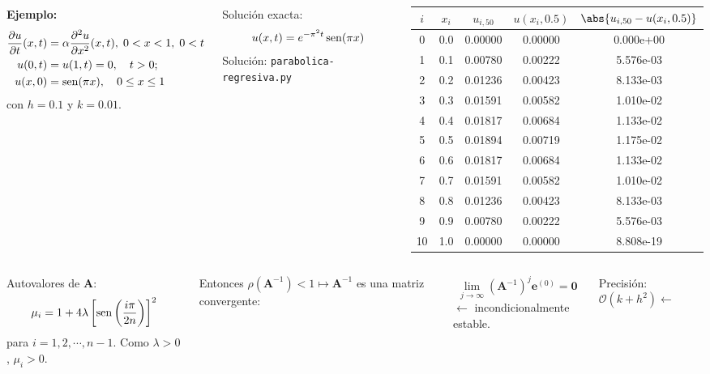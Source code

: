 \documentclass[9pt, aspectratio=169]{beamer}
\begin{document}
\begin{frame}
\begin{columns}
\textbf{Ejemplo:} 
\begin{align*}
\frac{\partial u}{\partial t} (x, t) &= \alpha \frac{\partial^2 u}{\partial x^2}(x, t), \; 0 < x < 1, \; 0 < t \\
u(0, t) &= u(1, t) = 0, \quad t > 0; \\
u(x, 0) &= \operatorname{sen}(\pi x), \quad 0 \leq x \leq 1
\end{align*}
con $h = 0.1$ y \alert{$k = 0.01$}.

Solución exacta:
\[u(x, t) = e^{-\pi^2 t} \operatorname{sen} (\pi x) \]
\centering Solución: \texttt{parabolica-regresiva.py}

\begin{center}
\begin{tabular}{ccccc}
\toprule
$i$ & $x_i$ & $u_{i,50}$ & $u(x_i, 0.5)$ & $\abs{u_{i, 50} - u(x_i, 0.5)}$ \\
\midrule
0 & 0.0 & 0.00000 & 0.00000 & 0.000e+00 \\
1 & 0.1 & 0.00780 & 0.00222 & 5.576e-03 \\
2 & 0.2 & 0.01236 & 0.00423 & 8.133e-03 \\
3 & 0.3 & 0.01591 & 0.00582 & 1.010e-02 \\
4 & 0.4 & 0.01817 & 0.00684 & 1.133e-02 \\
5 & 0.5 & 0.01894 & 0.00719 & 1.175e-02 \\
6 & 0.6 & 0.01817 & 0.00684 & 1.133e-02 \\
7 & 0.7 & 0.01591 & 0.00582 & 1.010e-02 \\
8 & 0.8 & 0.01236 & 0.00423 & 8.133e-03 \\
9 & 0.9 & 0.00780 & 0.00222 & 5.576e-03 \\
10 & 1.0 & 0.00000 & 0.00000 & 8.808e-19 \\
\bottomrule
\end{tabular} 
\end{center}
\end{columns} \pause
\vspace{1em}
  \begin{columns}
  \cx
  Autovalores de $\bm{A}$:
  \[ \mu_i = 1 + 4 \lambda \left[ \operatorname{sen} \left(\frac{i \pi}{2 n}\right) \right]^2 \]
  para $i = 1, 2, \cdots, n-1$. Como $\lambda > 0$, $\mu_i > 0$.

  \cx
  Entonces $\rho(\bm{A}^{-1}) < 1 \mapsto \bm{A}^{-1}$ es una matriz convergente:
  \begin{columns}
  \[ \lim_{j \to \infty} (\bm{A}^{-1})^j \bm{e}^{(0)} = \bm{0} \]
  $\leftarrow$ \alert{incondicionalmente estable}.
  \end{columns} \pause
  \centering Precisión: $\mathcal{O}(k + h^2) \leftarrow$ \faThumbsODown
  \end{columns}
\end{frame}
\end{document}
